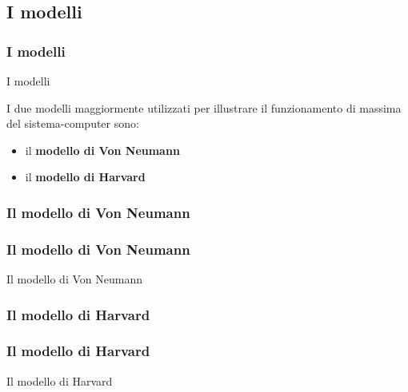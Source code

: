 \subsection[I modelli]{I modelli}
\begin{frame}
	\frametitle{I modelli}
	
	\begin{block}{I modelli}
		
		I due modelli maggiormente utilizzati per illustrare il funzionamento di massima del sistema-computer sono:
		\begin{itemize}
			\item il \textbf{modello di Von Neumann}
			\item il \textbf{modello di Harvard}
		\end{itemize}
	\end{block}
	
	
\end{frame}

\subsubsection[Il modello di Von Neumann]{Il modello di Von Neumann}
\begin{frame}
	\frametitle{Il modello di Von Neumann}
	
	\begin{block}{Il modello di Von Neumann}
	
	\end{block}
	
	
\end{frame}


\subsubsection[Il modello di Harvard]{Il modello di Harvard}

\begin{frame}
	\frametitle{Il modello di Harvard}
	
	\begin{block}{Il modello di Harvard}
	
	\end{block}
	
	
\end{frame}
